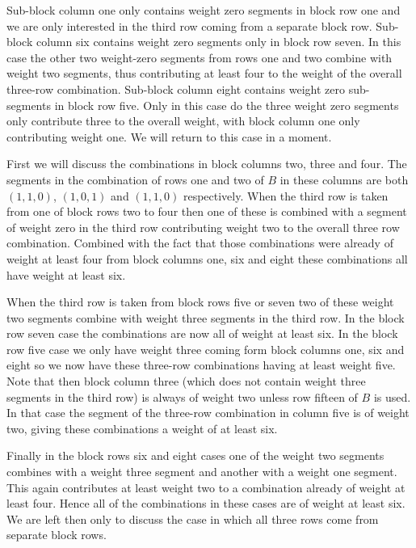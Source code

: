 Sub-block column one only contains weight zero segments in block row one and we are only interested in the third row coming from a separate block row.
Sub-block column six contains weight zero segments only in block row seven.
In this case the other two weight-zero segments from rows one and two combine with weight two segments, thus contributing at least four to the weight of the overall three-row combination.
Sub-block column eight contains weight zero sub-segments in block row five.
Only in this case do the three weight zero segments only contribute three to the overall weight, with block column one only contributing weight one.
We will return to this case in a moment.

First we will discuss the combinations in block columns two, three and four.
The segments in the combination of rows one and two of $B$ in these columns are both $(1,1,0)$, $(1,0,1)$ and $(1,1,0)$ respectively.
When the third row is taken from one of block rows two to four then one of these is combined with a segment of weight zero in the third row contributing weight two to the overall three row combination.
Combined with the fact that those combinations were already of weight at least four from block columns one, six and eight these combinations all have weight at least six.

When the third row is taken from block rows five or seven two of these weight two segments combine with weight three segments in the third row.
In the block row seven case the combinations are now all of weight at least six.
In the block row five case we only have weight three coming form block columns one, six and eight so we now have these three-row combinations having at least weight five.
Note that then block column three (which does not contain weight three segments in the third row) is always of weight two unless row fifteen of $B$ is used.
In that case the segment of the three-row combination in column five is of weight two, giving these combinations a weight of at least six.

Finally in the block rows six and eight cases one of the weight two segments combines with a weight three segment and another with a weight one segment.
This again contributes at least weight two to a combination already of weight at least four.
Hence all of the combinations in these cases are of weight at least six.
We are left then only to discuss the case in which all three rows come from separate block rows.

